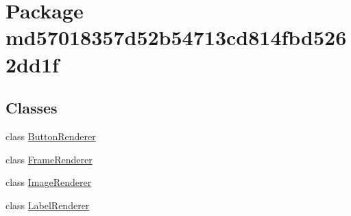 \hypertarget{namespacemd57018357d52b54713cd814fbd5262dd1f}{
\section{Package md57018357d52b54713cd814fbd5262dd1f}
\label{namespacemd57018357d52b54713cd814fbd5262dd1f}
}
\subsection*{Classes}
\begin{CompactItemize}
\item 
class \hyperlink{classmd57018357d52b54713cd814fbd5262dd1f_1_1_button_renderer}{ButtonRenderer}
\item 
class \hyperlink{classmd57018357d52b54713cd814fbd5262dd1f_1_1_frame_renderer}{FrameRenderer}
\item 
class \hyperlink{classmd57018357d52b54713cd814fbd5262dd1f_1_1_image_renderer}{ImageRenderer}
\item 
class \hyperlink{classmd57018357d52b54713cd814fbd5262dd1f_1_1_label_renderer}{LabelRenderer}
\end{CompactItemize}
